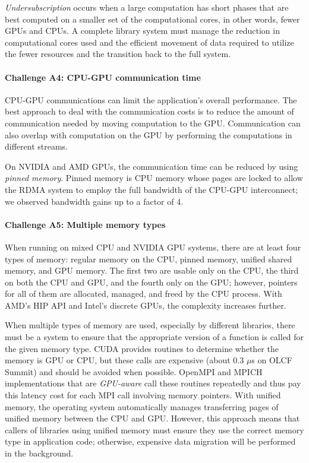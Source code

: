 \documentclass[5p,times]{elsarticle}
\begin{document}
\emph{Undersubscription} occurs when a large computation has short phases that are best computed on a smaller set of the computational cores, in other words, fewer GPUs and CPUs. A complete library system must manage the reduction in computational cores used
and the efficient movement of data required to utilize the fewer resources and the transition back to the full system.

\paragraph{Challenge A4: CPU-GPU communication time}
\label{subsec:ChallengeF2}
CPU-GPU communications can limit the application's overall performance. The best approach to deal with the communication costs is
to reduce the amount of communication needed by moving computation to the GPU. Communication can also overlap with computation on the GPU by performing the computations in different streams.

On NVIDIA and AMD GPUs, the communication time can be reduced by
using {\em pinned memory}. Pinned memory is CPU memory whose pages are
locked to allow the RDMA system to employ the full bandwidth of the CPU-GPU interconnect; we observed bandwidth gains up to a factor of 4. 


\paragraph{Challenge A5: Multiple memory types}
\label{subsec:ChallengeD1}
When running on mixed CPU and NVIDIA GPU systems, there are at least four types of memory: regular memory on the CPU,
pinned memory,
unified shared memory, and GPU memory. %
The first two are usable only on the CPU, the
third on both the CPU and GPU, and the fourth  only  on the GPU;
however, pointers for all of them are allocated, managed, and freed by the CPU
process. With AMD's HIP API and Intel's discrete GPUs, the complexity increases further.

When multiple types of memory are used, especially by different libraries, there must be a system to ensure that the appropriate
version of a function is called for the given memory type. CUDA provides routines to determine
whether the memory is GPU or CPU, but these calls
are  expensive (about 0.3 $\mu$s on OLCF Summit) and should be avoided when possible.
OpenMPI and MPICH implementations that are {\em GPU-aware} call these routines repeatedly and thus pay this latency cost for
each MPI call involving memory pointers.
With unified memory, the operating
system automatically manages transferring pages of unified memory between
the CPU and GPU. However, this approach means that
callers of libraries using unified memory must ensure they use the correct memory type in application code; otherwise, expensive data migration will be performed in the background.
\end{document}
